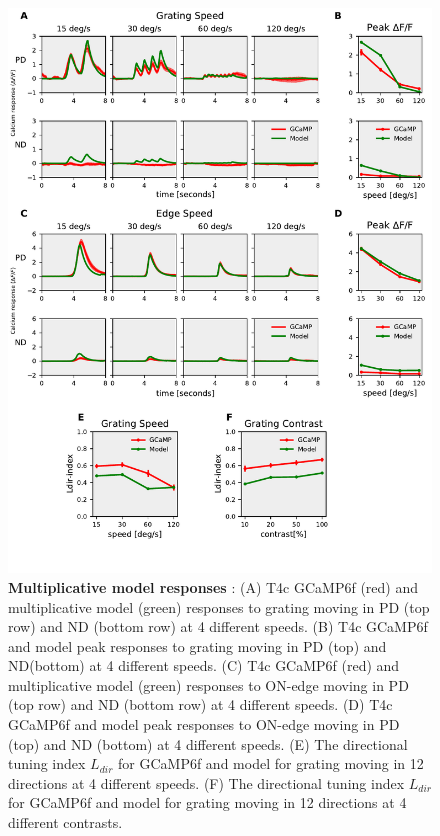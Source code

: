 \documentclass[9pt,lineno]{elife}
\begin{document}
\begin{figure}
\begin{fullwidth}
\includegraphics[width=0.84\linewidth]{figure5}
\caption{\textbf{Multiplicative model responses} : (A) T4c GCaMP6f (red) and multiplicative model (green) responses to grating moving in PD (top row) and ND (bottom row) at 4 different speeds. (B) T4c GCaMP6f and model peak responses to grating moving in PD (top) and ND(bottom) at 4 different speeds. (C) T4c GCaMP6f (red) and multiplicative model (green) responses to ON-edge moving in PD (top row) and ND (bottom row) at 4 different speeds. (D) T4c GCaMP6f and model peak responses to ON-edge moving in PD (top) and ND (bottom) at 4 different speeds. (E) The directional tuning index $L_{dir}$ for GCaMP6f and model for grating moving in 12 directions at 4 different speeds. (F) The directional tuning index $L_{dir}$ for GCaMP6f and model for grating moving in 12 directions at 4 different contrasts.}

\label{PDNDModel}
	
\end{fullwidth}
\end{figure} 
\end{document}
